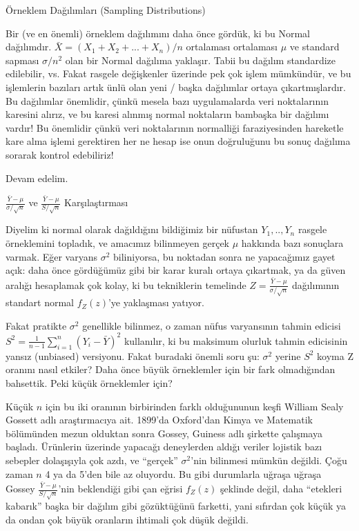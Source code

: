 \documentclass[12pt,fleqn]{article}\usepackage{../../common}
\begin{document}
Örneklem Dağılımları (Sampling Distributions)

Bir (ve en önemli) örneklem dağılımını daha önce gördük, ki bu Normal
dağılımdır. $\bar{X} = (X_1 + X_2 + ... + X_n) / n$ ortalaması ortalaması
$\mu$ ve standard sapması $\sigma/n^2$ olan bir Normal dağılıma
yaklaşır. Tabii bu dağılım standardize edilebilir, vs. Fakat rasgele
değişkenler üzerinde pek çok işlem mümkündür, ve bu işlemlerin bazıları
artık ünlü olan yeni / başka dağılımlar ortaya çıkartmışlardır. Bu
dağılımlar önemlidir, çünkü mesela bazı uygulamalarda veri noktalarının
karesini alırız, ve bu karesi alınmış normal noktaların bambaşka bir
dağılımı vardır! Bu önemlidir çünkü veri noktalarının normalliği
faraziyesinden hareketle kare alma işlemi gerektiren her ne hesap ise onun
doğruluğunu bu sonuç dağılıma sorarak kontrol edebiliriz! 

Devam edelim. 

$\frac{\bar{Y}-\mu}{\sigma / \sqrt{n}}$ ve $\frac{\bar{Y}-\mu}{S  /\sqrt{n}}$ 
Karşılaştırması

Diyelim ki normal olarak dağıldığını bildiğimiz bir nüfustan $Y_1,..,Y_n$
rasgele örneklemini topladık, ve amacımız bilinmeyen gerçek $\mu$ hakkında
bazı sonuçlara varmak. Eğer varyans $\sigma^2$ biliniyorsa, bu noktadan
sonra ne yapacağımız gayet açık: daha önce gördüğümüz gibi bir karar kuralı
ortaya çıkartmak, ya da güven aralığı hesaplamak çok kolay, ki bu
tekniklerin temelinde $Z = \frac{\bar{Y}-\mu}{\sigma / \sqrt{n}}$ dağılımının standart normal $f_Z(z)$'ye 
yaklaşması yatıyor. 

Fakat pratikte $\sigma^2$ genellikle bilinmez, o zaman nüfus varyansının
tahmin edicisi $S^2 = \frac{1}{n-1}\sum_{i=1}^n (Y_i-\bar{Y})^2$
kullanılır, ki bu maksimum olurluk tahmin edicisinin yansız (unbiased)
versiyonu. Fakat buradaki önemli soru şu: $\sigma^2$ yerine $S^2$ koyma Z
oranını nasıl etkiler? Daha önce büyük örneklemler için bir fark
olmadığından bahsettik. Peki küçük örneklemler için? 

Küçük $n$ için bu iki oranının birbirinden farklı olduğununun keşfi William
Sealy Gossett adlı araştırmacıya ait. 1899'da Oxford'dan Kimya ve Matematik
bölümünden mezun olduktan sonra Gossey, Guiness adlı şirkette çalışmaya
başladı. Ürünlerin üzerinde yapacağı deneylerden aldığı veriler lojistik
bazı sebepler dolaşışıyla çok azdı, ve ``gerçek'' $\sigma^2$'nin bilinmesi
mümkün değildi. Çoğu zaman $n$ 4 ya da 5'den bile az oluyordu. Bu gibi
durumlarla uğraşa uğraşa Gossey $\frac{\bar{Y}-\mu}{S / \sqrt{n}}$'nin
beklendiği gibi çan eğrisi $f_Z(z)$ şeklinde değil, daha ``etekleri
kabarık'' başka bir dağılım gibi gözüktüğünü farketti, yani sıfırdan çok
küçük ya da ondan çok büyük oranların ihtimali çok düşük değildi. 
 
\end{document}
